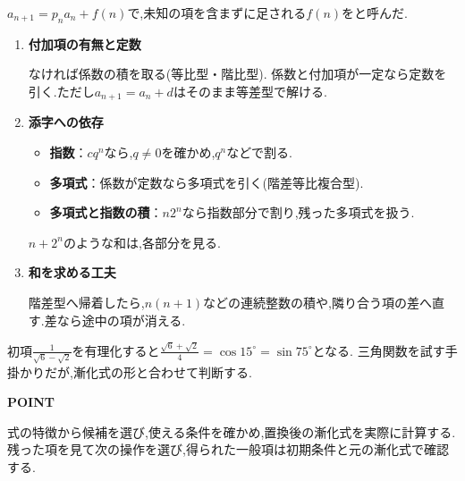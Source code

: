   $a_{n+1}=p_na_n+f(n)$で,未知の項を含まずに足される$f(n)$をと呼んだ.
  \begin{enumerate}
    \item \textbf{付加項の有無と定数}

      なければ係数の積を取る(等比型・階比型).
      係数と付加項が一定なら定数を引く.ただし$a_{n+1}=a_n+d$はそのまま等差型で解ける.

    \item \textbf{添字への依存}

      \begin{itemize}[beginpenalty=10000]
        \item \textbf{指数}：$cq^n$なら,$q\ne0$を確かめ,$q^n$などで割る.
        \item \textbf{多項式}：係数が定数なら多項式を引く(階差等比複合型).
        \item \textbf{多項式と指数の積}：$n2^n$なら指数部分で割り,残った多項式を扱う.
      \end{itemize}
      $n+2^n$のような和は,各部分を見る.

    \item \textbf{和を求める工夫}

      階差型へ帰着したら,$n(n+1)$などの連続整数の積や,隣り合う項の差へ直す.差なら途中の項が消える.
  \end{enumerate}

  \medskip

  初項$\frac{1}{\sqrt6-\sqrt2}$を有理化すると$\frac{\sqrt6+\sqrt2}{4}=\cos15^\circ=\sin75^\circ$となる.
  三角関数を試す手掛かりだが,漸化式の形と合わせて判断する.
  \par
\endgroup

\begin{bookpoint}
  \textbf{POINT}\par
  式の特徴から候補を選び,使える条件を確かめ,置換後の漸化式を実際に計算する.
  残った項を見て次の操作を選び,得られた一般項は初期条件と元の漸化式で確認する.
\end{bookpoint}


